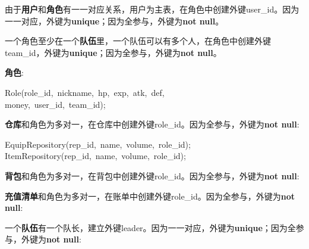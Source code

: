 \documentclass{article}
\begin{document}
\noindent{}由于\textbf{用户}和\textbf{角色}有一一对应关系，用户为主表，在角色中创建外键user\_id。因为一一对应，外键为\textbf{unique}；因为全参与，外键为\textbf{not null}。%

一个角色至少在一个\textbf{队伍}里，一个队伍可以有多个人，在角色中创建外键team\_id，外键为\textbf{unique}；因为全参与，外键为\textbf{not null}。%

\textbf{角色}:%
\begin{mdpre}%
\noindent Role(role\_id,~nickname,~hp,~exp,~atk,~def,\\
money,~user\_id,~team\_id);%
\end{mdpre}
\mdhr{}%

\noindent{}\textbf{仓库}和角色为多对一，在仓库中创建外键role\_id。因为全参与，外键为\textbf{not null}:%
\begin{mdpre}%
\noindent EquipRepository(rep\_id,~name,~volume,~role\_id);\\
ItemRepository(rep\_id,~name,~volume,~role\_id);%
\end{mdpre}
\mdhr{}%

\noindent{}\textbf{背包}和角色为多对一，在背包中创建外键role\_id。因为全参与，外键为\textbf{not null}:%


\mdhr{}%

\noindent{}\textbf{充值清单}和角色为多对一，在账单中创建外键role\_id。因为全参与，外键为\textbf{not null}:%


一个\textbf{队伍}有一个队长，建立外键leader。因为一一对应，外键为\textbf{unique}；因为全参与，外键为\textbf{not null}:%
\end{document}
